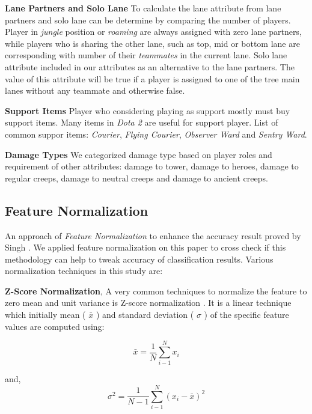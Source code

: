 \textbf{Lane Partners and Solo Lane} To calculate the lane attribute from lane partners and solo lane can be determine by comparing the number of players. Player in \textit{jungle} position or \textit{roaming} are always assigned with zero lane partners, while players who is sharing the other lane, such as top, mid or bottom lane are corresponding with number of their \textit{teammates} in the current lane. Solo lane attribute included in our attributes as an alternative to the lane partners. The value of this attribute will be true if a player is assigned to one of the tree main lanes without any teammate and otherwise false.

\textbf{Support Items} Player who considering playing as support mostly must buy support items. Many items in \textit{Dota 2} are useful for support player. List of common suppor items: \textit{Courier}, \textit{Flying Courier}, \textit{Observer Ward} and \textit{Sentry Ward}. 

\textbf{Damage Types} We categorized damage type based on player roles and requirement of other attributes: damage to tower, damage to heroes, damage to regular creeps, damage to neutral creeps and damage to ancient creeps.

\subsection{Feature Normalization}
\label{sec:featurenorm}

An approach of \textit{Feature Normalization} to enhance the accuracy result proved by Singh \cite{singh2015investigations}. We applied feature normalization on this paper to cross check if this methodology can help to tweak accuracy of classification results. Various normalization techniques in this study are:

\textbf{Z-Score Normalization}, A very common techniques to normalize the feature to zero mean and unit variance is Z-score normalization \cite{jayalakshmi2011statistical}. It is a linear technique which initially mean ( \(\bar{x}\) ) and standard deviation ( \(\sigma\) ) of the specific feature values are computed using:

\begin{equation}
\bar{x}=\frac{1}{N}\sum_{i-1}^{N}x_{i}
\end{equation}

and,
\begin{equation}
\sigma^2=\frac{1}{N-1}\sum_{i-1}^{N}(x_{i}-\bar{x})^2
\end{equation}

